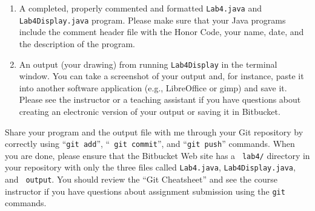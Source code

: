 \begin{enumerate}

  \item A completed, properly commented and formatted {\tt Lab4.java} and {\tt Lab4Display.java} program. Please
    make sure that your Java programs include the comment header file with the Honor Code, your name, date, and
    the description of the program.

  \item An output (your drawing) from running {\tt Lab4Display} in the terminal window. You can take a screenshot of
    your output and, for instance, paste it into another software application (e.g., LibreOffice or gimp) and save it.
    Please see the instructor or a teaching assistant if you have questions about creating an electronic version of your
    output or saving it in Bitbucket.

\end{enumerate}

\vspace{-0.1in}

Share your program and the output file with me through your Git repository by correctly using ``{\tt git add}'', ``{\tt
git commit}'', and ``{\tt git push}'' commands. When you are done, please ensure that the Bitbucket Web site has a {\tt
lab4/} directory in your repository with only the three files called {\tt Lab4.java}, {\tt Lab4Display.java}, and {\tt
output}. You should review the ``Git Cheatsheet'' and see the course instructor if you have questions about assignment
submission using the {\tt git} commands.


